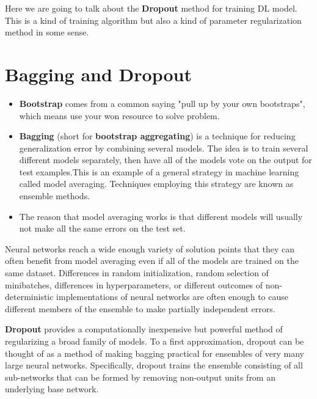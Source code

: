
Here we are going to talk about the \textbf{Dropout} method for training DL model. This is a kind of training algorithm but also a kind of parameter regularization method in some sense.


\section{Bagging and Dropout}
\begin{itemize}
	\item \textbf{Bootstrap} comes from a common saying "pull up by your own bootstraps", which means use your won resource to solve problem.
	\item \textbf{Bagging} (short for \textbf{bootstrap aggregating}) is a technique for reducing generalization error by combining several models. The idea is to train several different models separately, then have all of the models vote on the	output for test examples.This is an example of a general strategy in machine learning called	model averaging. Techniques employing this strategy are known as ensemble methods.
	\item The reason that model averaging works is that different models will usually
	not make all the same errors on the test set.
\end{itemize}
Neural networks reach a wide enough variety of solution points that they can often benefit from model averaging even if all of the models are trained on the same dataset. Differences in random initialization, random selection of minibatches,
differences in hyperparameters, or different outcomes of non-deterministic implementations of neural networks are often enough to cause different members of the ensemble to make partially independent errors.

\textbf{Dropout} provides a computationally inexpensive but	powerful method of regularizing a broad family of models. To a first approximation, dropout can be thought of as a method of making bagging practical for ensembles of very many large neural networks. Specifically, dropout trains the ensemble consisting of all sub-networks that can be formed by removing non-output units from an underlying base network.

